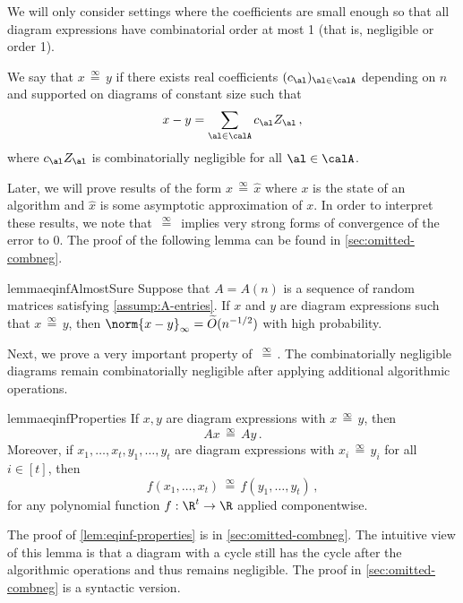 \documentclass[12pt]{article}
\newcommand{\eqinf}{\,\overset{\infty}{=}\,}
\begin{document}
We will only consider settings where the coefficients are small enough so that all diagram expressions have combinatorial order at most 1 (that is, negligible or order 1).

\begin{definition}[$\eqinf$]\label{def:asymptotic-equality}
    We say that $x\eqinf y$ if there exists real coefficients $(c_\al)_{\al\in \calA}$ depending on $n$ and supported on diagrams of constant size such that
    \[
        x-y = \sum_{\al\in\calA} c_\al Z_\al\,,
    \]
    where $c_\al Z_\al$ is combinatorially negligible for all $\al\in\calA$.
\end{definition}

Later, we will prove results of the form $x \eqinf \widehat x$ where $x$
is the state of an algorithm and $\widehat x$ is some asymptotic approximation of $x$.
In order to interpret these results, we note that $\eqinf$ implies very strong forms of convergence of the error to $0$. The proof of the following lemma can be found in \cref{sec:omitted-combneg}.


\begin{restatable}{lemma}{eqinfAlmostSure}
\label{lem:eqinf-almostsure}
    Suppose that $A=A(n)$ is a sequence of random matrices satisfying \cref{assump:A-entries}.
    If $x$ and $y$ are diagram expressions such that $x\eqinf y$, then $\norm{x-y}_\infty = \widetilde{O}(n^{-1/2})$ with high probability.
\end{restatable}

Next, we prove a very important property of $\eqinf$.
The combinatorially negligible diagrams remain combinatorially negligible
after applying additional algorithmic operations.

\begin{restatable}{lemma}{eqinfProperties}
\label{lem:eqinf-properties}
    If $x,y$ are diagram expressions with $x \eqinf y$, then
    \[
        Ax\eqinf Ay\,.
    \]
    Moreover, if $x_1, \dots, x_t,y_1, \dots, y_t$ are diagram expressions with $x_i \eqinf y_i$ for all $i\in [t]$, then
    \[
        f(x_1, \dots, x_t) \eqinf f(y_1, \dots, y_t)\,,
    \]
    for any polynomial function $f:\R^t\to \R$ applied componentwise.
\end{restatable}

The proof of \cref{lem:eqinf-properties} is in \cref{sec:omitted-combneg}.
The intuitive view of this lemma is that a diagram with a cycle still has the cycle after the algorithmic operations and thus remains negligible.
The proof in \cref{sec:omitted-combneg} is a syntactic version.
\end{document}

